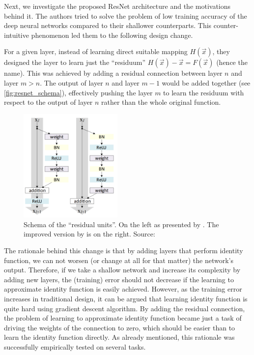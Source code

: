 Next, we investigate the proposed ResNet architecture and the motivations behind it. The authors tried to solve the problem of low training accuracy of the deep neural networks compared to their shallower counterparts. This counter-intuitive phenomenon led them to the following design change.

For a given layer, instead of learning direct suitable mapping $H(\vec{x})$, they designed the layer to learn just the ``residuum'' $H(\vec{x}) - \vec{x} = F(\vec{x})$ (hence the name). This was achieved by adding a residual connection between layer $n$ and layer $m > n$. The output of layer $n$ and layer $m - 1$ would be added together (see \autoref{fig:resnet_schema}), effectively pushing the layer $m$ to learn the residuum with respect to the output of layer $n$ rather than the whole original function.

\begin{figure}
    \centering
    \includegraphics[width=0.45\textwidth]{img/resnetv2.png}
    \caption[Residual units]{Schema of the ``residual units''. On the left as presented by \cite{resnet}. The improved version by \cite{resnetimp} is on the right. Source: \cite{resnetimp}}
    \label{fig:resnet_schema}
\end{figure}

The rationale behind this change is that by adding layers that perform identity function, we can not worsen (or change at all for that matter) the network's output. Therefore, if we take a shallow network and increase its complexity by adding new layers, the (training) error should not decrease if the learning to approximate identity function is easily achieved. However, as the training error increases in traditional design, it can be argued that learning identity function is quite hard using gradient descent algorithm. By adding the residual connection, the problem of learning to approximate identity function became just a task of driving the weights of the connection to zero, which should be easier than to learn the identity function directly. As already mentioned, this rationale was successfully empirically tested on several tasks.

